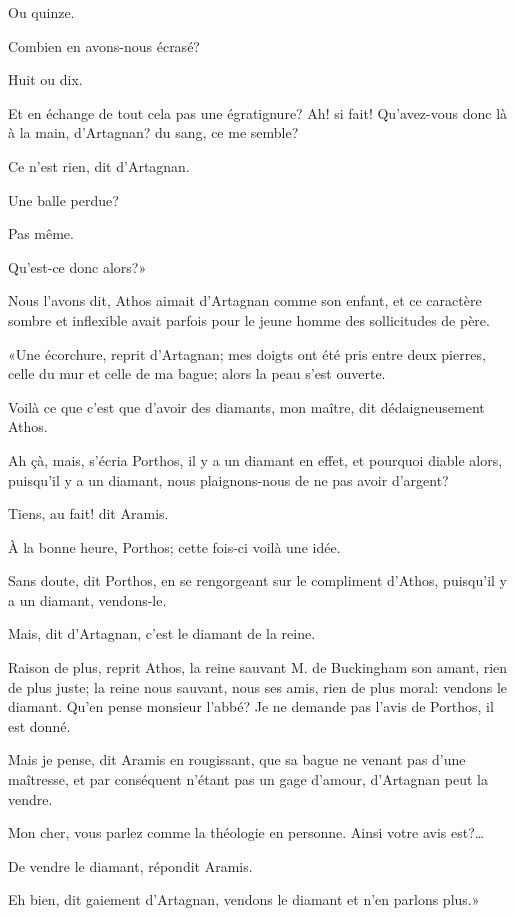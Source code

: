 \speak  Ou quinze. 

\speak  Combien en avons-nous écrasé? 

\speak  Huit ou dix. 

\speak  Et en échange de tout cela pas une égratignure? Ah! si fait! Qu'avez-vous donc là à la main, d'Artagnan? du sang, ce me semble? 

\speak  Ce n'est rien, dit d'Artagnan. 

\speak  Une balle perdue? 

\speak  Pas même. 

\speak  Qu'est-ce donc alors?» 

Nous l'avons dit, Athos aimait d'Artagnan comme son enfant, et ce caractère sombre et inflexible avait parfois pour le jeune homme des sollicitudes de père. 

«Une écorchure, reprit d'Artagnan; mes doigts ont été pris entre deux pierres, celle du mur et celle de ma bague; alors la peau s'est ouverte. 

\speak  Voilà ce que c'est que d'avoir des diamants, mon maître, dit dédaigneusement Athos. 

\speak  Ah çà, mais, s'écria Porthos, il y a un diamant en effet, et pourquoi diable alors, puisqu'il y a un diamant, nous plaignons-nous de ne pas avoir d'argent? 

\speak  Tiens, au fait! dit Aramis. 

\speak  À la bonne heure, Porthos; cette fois-ci voilà une idée. 

\speak  Sans doute, dit Porthos, en se rengorgeant sur le compliment d'Athos, puisqu'il y a un diamant, vendons-le. 

\speak  Mais, dit d'Artagnan, c'est le diamant de la reine. 

\speak  Raison de plus, reprit Athos, la reine sauvant M. de Buckingham son amant, rien de plus juste; la reine nous sauvant, nous ses amis, rien de plus moral: vendons le diamant. Qu'en pense monsieur l'abbé? Je ne demande pas l'avis de Porthos, il est donné. 

\speak  Mais je pense, dit Aramis en rougissant, que sa bague ne venant pas d'une maîtresse, et par conséquent n'étant pas un gage d'amour, d'Artagnan peut la vendre. 

\speak  Mon cher, vous parlez comme la théologie en personne. Ainsi votre avis est?\dots 

\speak  De vendre le diamant, répondit Aramis. 

\speak  Eh bien, dit gaiement d'Artagnan, vendons le diamant et n'en parlons plus.» 

